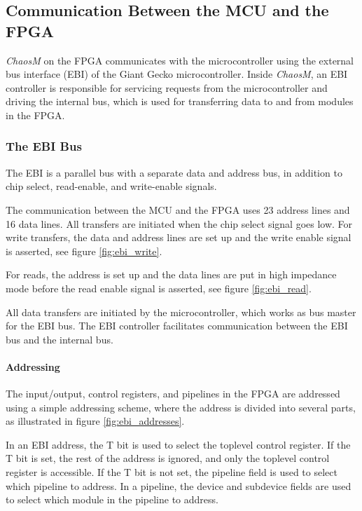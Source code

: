 
\FloatBarrier
\subsection{Communication Between the MCU and the FPGA}\label{section:fpga-buses}

\textit{ChaosM} on the FPGA communicates with the microcontroller using the external bus interface
(EBI) of the Giant Gecko microcontroller. Inside \textit{ChaosM}, an EBI controller is responsible
for servicing requests from the microcontroller and driving the internal bus, which
is used for transferring data to and from modules in the FPGA.

\subsubsection{The EBI Bus}
The EBI\cite{efm_ebi} is a parallel bus with a separate data and address bus, in
addition to chip select, read-enable, and write-enable signals.

The communication between the MCU and the FPGA uses 23 address lines and 16 data
lines. All transfers are initiated when the chip select signal goes low. For
write transfers, the data and address lines are set up and the write enable
signal is asserted, see figure \ref{fig:ebi_write}.

For reads, the address is set up and the data lines are put in high impedance mode
before the read enable signal is asserted, see figure \ref{fig:ebi_read}.




All data transfers are initiated by the microcontroller, which works as bus
master for the EBI bus. The EBI controller facilitates communication between
the EBI bus and the internal bus.

\FloatBarrier
\paragraph{Addressing}

The input/output, control registers, and pipelines in the FPGA are addressed
using a simple addressing scheme, where the address is divided into several
parts, as illustrated in figure \ref{fig:ebi_addresses}.



In an EBI address, the T bit is used to select the toplevel control register.
If the T bit is set, the rest of the address is ignored, and only the toplevel
control register is accessible. If the T bit is not set, the pipeline field is
used to select which pipeline to address. In a pipeline, the device
and subdevice fields are used to select which module in the pipeline to address.

